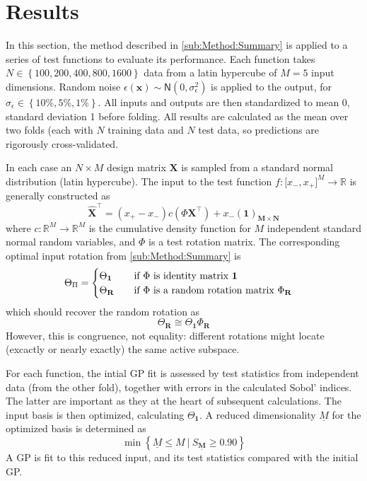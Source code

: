 \documentclass[preprint,12pt]{elsarticle}
\newcommand*{\M}[1]{\ensuremath{#1}\xspace}
\newcommand*{\vr}[1]{\M{\mathbf{#1}}}
\newcommand*{\st}[1]{\M{\mathbb{#1}}}
\newcommand{\T}[1]{\text{#1}}
\newcommand*{\QT}[2][]{\M{\quad\T{#2}\ifthenelse{\equal{#1}{}}{\quad}{#1}}}
\newcommand*{\set}[1]{\M{\left\lbrace#1\right\rbrace}}
\newcommand*{\setbuilder}[2]{\M{\left\lbrace#1 \: \big\vert \: #2\right\rbrace}}
\begin{document}
    \section{Results} \label{sec:Results}
        In this section, the method described in \cref{sub:Method:Summary} is applied to a series of test functions to evaluate its performance. Each function takes $N \in \set{100, 200, 400, 800, 1600}$ data from a latin hypercube of $M=5$ input dimensions. Random noise $\epsilon(\vr{x}) \sim \mathsf{N}(0,\sigma_{\epsilon}^{2})$ is applied to the output, for $\sigma_{\epsilon} \in \set{10\%, 5\%, 1\%}$. All inputs and outputs are then standardized to mean 0, standard deviation 1 before folding.
        All results are calculated as the mean over two folds (each with $N$ training data and $N$ test data, so predictions are rigorously cross-validated. 

        In each case an \M{N \times M} design matrix \vr{X} is sampled from a standard normal distribution (latin hypercube). 
        The input to the test function \M{f\colon \lbrack x_-, x_+ \rbrack^{M} \to \st{R}} is generally constructed as
        \begin{equation} \label{def:Xhat}
            \vr{\hat{X}}^{\intercal} = (x_+ - x_-) c(\Phi \vr{X}^{\intercal}) + x_-(\vr{1})_{\vr{M} \times \vr{N}}
        \end{equation}
        where \M{c\colon \st{R}^M\to\st{R}^M} is the cumulative density function for \M{M} independent standard normal random variables, and \M{\Phi} is a test rotation matrix. 
        The corresponding optimal input rotation from \cref{sub:Method:Summary} is
        \begin{equation}
            \Theta_{\Pi} = \begin{cases}
                \Theta_{\vr{1}} & \QT{if \M{\Phi} is identity matrix \M{\vr{1}}} \\
                \Theta_{\vr{R}} & \QT{if \M{\Phi} is a random rotation matrix \M{\Phi_{\vr{R}}}}
            \end{cases}
        \end{equation}
        which should recover the random rotation as
        \begin{equation}
            \Theta_{\vr{R}} \cong \Theta_{\vr{1}} \Phi_{\vr{R}}
        \end{equation}
        However, this is congruence, not equality: different rotations might locate (excactly or nearly exactly) the same active subspace.

        For each function, the intial GP fit is assessed by test statistics from independent data (from the other fold), together with errors in the calculated Sobol' indices. The latter are important as they at the heart of subsequent calculations. The input basis is then optimized, calculating $\Theta_{\vr{1}}$.
        A reduced dimensionality \M{\underline{M}} for the optimized basis is determined as 
        \begin{equation} \label{eq:Results:Mbar}
            \min \setbuilder{\underline{M} \leq M}{S_{\underline{\vr{M}}} \geq 0.90}
        \end{equation}
        A GP is fit to this reduced input, and its test statistics compared with the initial GP.
\end{document}
